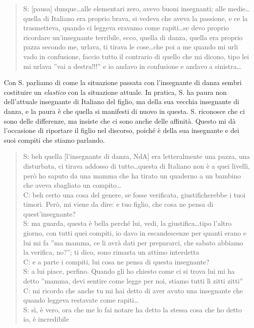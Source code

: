 \begin{verse}
S: [pausa] dunque\ldots{}alle elementari zero, avevo buoni insegnanti; alle medie\ldots{}quella di Italiano era proprio brava, si vedeva che aveva la passione, e ce la trasmetteva, quando ci leggeva eravamo come rapiti\ldots{}se devo proprio ricordare un'insegnante terribile, ecco, quella di danza, quella era proprio pazza secondo me, urlava, ti tirava le cose\ldots{}che poi a me quando mi urli vado in confusione, faccio tutto il contrario di quello che mi dicono, tipo lei mi urlava ''vai a destra!!!'' e io andavo in confusione e andavo a sinistra\ldots\\
\end{verse}

Con S. parliamo di come la situazione passata con l'insegnante di danza sembri costituire un \emph{elastico} con la situazione attuale. In pratica, S. ha paura non dell'attuale insegnante di Italiano del figlio, ma della sua vecchia insegnante di danza, e la paura è che quella si manifesti di nuovo in questa. S. riconosce che ci sono delle differenze, ma insiste che ci sono anche delle affinità. Questo mi dà l'occasione di riportare il figlio nel discorso, poiché è della sua insegnante e dei suoi compiti che stiamo parlando.

\begin{verse}
S: beh quella [l'insegnante di danza, NdA] era letteralmente una pazza, una disturbata, ci tirava addosso di tutto\ldots{}questa di Italiano non è a quei livelli, però ho saputo da una mamma che ha tirato un quaderno a un bambino che aveva sbagliato un compito\ldots\\
C: beh certo una cosa del genere, se fosse verificata, giustificherebbe i tuoi timori. Però, mi viene da dire: e tuo figlio, che cosa ne pensa di quest'insegnante?\\
S: ma guarda, questa è bella perché lui, vedi, la giustifica\ldots{}tipo l'altro giorno, con tutti quei compiti, io davo in escandescenze per quanti erano e lui mi fa ''ma mamma, ce li avrà dati per prepararci, che sabato abbiamo la verifica, no?''; ti dico, sono rimasta un attimo interdetta\\
C: e a parte i compiti, lui cosa ne pensa di questa insegnante?\\
S: a lui piace, perfino. Quando gli ho chiesto come ci si trova lui mi ha detto ''mamma, devi sentire come legge per noi, stiamo tutti lì zitti zitti''\\
C: mi ricordo che anche tu mi hai detto di aver avuto una insegnante che quando leggeva restavate come rapiti\ldots\\
S: sì, è vero, ora che me lo fai notare ha detto la stessa cosa che ho detto io, è incredibile\\
\end{verse}

